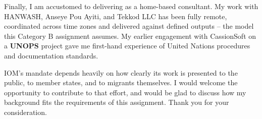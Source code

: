 \documentclass[11pt,a4paper,sans]{moderncv}
\begin{document}
Finally, I am accustomed to delivering as a home-based consultant. My work with HANWASH, Anseye Pou Ayiti, and Tekkod LLC has been fully remote, coordinated across time zones and delivered against defined outputs -- the model this Category B assignment assumes. My earlier engagement with CassionSoft on a \textbf{UNOPS} project gave me first-hand experience of United Nations procedures and documentation standards.

IOM's mandate depends heavily on how clearly its work is presented to the public, to member states, and to migrants themselves. I would welcome the opportunity to contribute to that effort, and would be glad to discuss how my background fits the requirements of this assignment. Thank you for your consideration.

\makeletterclosing
\end{document}
